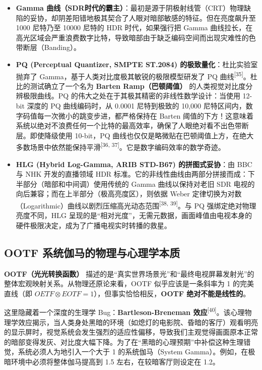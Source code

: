 \documentclass[12pt, a4paper]{ctexart}
\newcommand{\scite}[1]{\textsuperscript{[#1]}}
\begin{document}
\begin{itemize}
    \item \textbf{Gamma 曲线（SDR时代的霸主）}：最初是源于阴极射线管（CRT）物理缺陷的妥协，却阴差阳错地极其契合了人眼对暗部敏感的特征。但在亮度飙升至 1000 尼特乃至 10000 尼特的 HDR 时代，如果强行把 Gamma 曲线拉长，在高光区域会严重浪费数字比特，导致暗部由于缺乏编码空间而出现灾难性的色带断层（Banding）。
    \item \textbf{PQ (Perceptual Quantizer, SMPTE ST.2084) 的极致量化}：杜比实验室抛弃了 Gamma，基于人类对比度极其敏锐的极限模型研发了 PQ 曲线\scite{35}。杜比的测试确立了一个名为 \textbf{Barten Ramp（巴顿阈值）} 的人类视觉对比度分辨极限曲线。PQ 的伟大之处在于其极其精密的非线性数学设计：当使用 12-bit 深度的 PQ 曲线编码时，从 0.0001 尼特到极致的 10,000 尼特区间内，数字码值每一次微小的跳变步进，都严格保持在 Barten 阈值的下方！这意味着系统以绝对不浪费任何一个比特的最高效率，确保了人眼绝对看不出色带断层。即使降级使用 10-bit，PQ 曲线也仅仅是略微贴在巴顿阈值上方，在绝大多数场景中依然能保持平滑\scite{36, 37}。它是数字编码效率的数学奇迹。
    \item \textbf{HLG (Hybrid Log-Gamma, ARIB STD-B67) 的拼图式妥协}：由 BBC 与 NHK 开发的直播领域 HDR 标准。它的非线性曲线由两部分拼接而成：下半部分（暗部和中间调）使用传统的 Gamma 曲线以保持对老旧 SDR 电视的向后兼容；而在上半部分（极高亮度区），则依据 Weber 定律切换为对数（Logarithmic）曲线以剧烈压缩高光动态范围\scite{38, 39}。与 PQ 强绑定绝对物理亮度不同，HLG 呈现的是“相对光度”，无需元数据，画面峰值由电视本身的硬件极限决定，成为了广播电视实时转播的救星。
\end{itemize}

\subsection{OOTF 系统伽马的物理与心理学本质}

\textbf{OOTF（光光转换函数）} 描述的是“真实世界场景光”和“最终电视屏幕发射光”的整体宏观映射关系。从物理还原论来看，OOTF 似乎应该是一条斜率为 1 的完美直线（即 $OETF \otimes EOTF = 1$），但事实恰恰相反，\textbf{OOTF 绝对不能是线性的}。

这里隐藏着一个深度的生理学 Bug：\textbf{Bartleson-Breneman 效应}\scite{40}。该心理物理学效应揭示，当人类身处黑暗的环境（如熄灯的电影院、昏暗的客厅）观看明亮的显示屏时，视觉系统会发生强烈的适应性偏移，导致我们主观觉得画面原本正常的暗部变得发灰、对比度大幅下降。为了在“黑暗的心理预期”中补偿这种生理错觉，系统必须人为地引入一个大于 1 的系统伽马（System Gamma）。例如，在极暗环境中必须将整体伽马提高到 1.5 左右，在较暗客厅则设定在 1.2。
\end{document}
